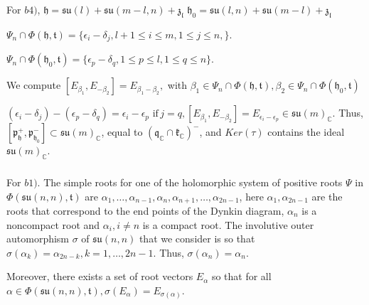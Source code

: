 \documentclass[12pt]{amsart}
\theoremstyle{definition}
\theoremstyle{remark}
\newcommand{\h}{\mathfrak{h}}
\renewcommand{\k}{{\mathfrak k}}
\renewcommand{\l}{\mathfrak l}
\newcommand{\p}{\mathfrak p}
\newcommand{\q}{\mathfrak q}
\newcommand{\z}{\mathfrak z}
\renewcommand{\t}{{\mathfrak t}}
\newcommand{\C}{{\mathbb C}}
\numberwithin{equation}{section}
\begin{document}
\medskip

 For $b4)$, $\h=  \mathfrak{su}(l)+ \mathfrak{su}(m-l,n)+  \z_\l$ $\h_0= \mathfrak{su}(l,n)+  \mathfrak{su}(m-l)+\z_\l$

$\Psi_n \cap \Phi(\h,\t)=\{ \epsilon_i -\delta_j, l+1\leq i\leq m, 1\leq j \leq n,  \}$.


$\Psi_n \cap \Phi(\h_0,\t)=\{ \epsilon_p -\delta_q,  1\leq p\leq l,   1 \leq q \leq n   \}$.

 We compute $[E_{\beta_1} ,E_{-\beta_2}]=E_{\beta_1 -\beta_2},$ with $\beta_1 \in \Psi_n \cap \Phi(\h,\t), \beta_2 \in \Psi_n \cap \Phi(\h_0,\t)$

$  (\epsilon_i -\delta_j)-
( \epsilon_p -\delta_q)=
\epsilon_i -\epsilon_p \,\, \text{if}\, j=q,     [E_{\beta_1} ,E_{-\beta_2}]=
E_{\epsilon_i -\epsilon_p}\in \mathfrak{su}(m)_\mathbb C$. Thus,
$[\p_\h^+ , \p_{\h_0}^- ] \subset \mathfrak{su}(m)_\C  $,  equal to $(\q_\C \cap \k_\C)^-$,
and  $Ker(\tau)$ contains
the ideal $\mathfrak{su}(m)_\C$.
\medskip

\subsubsection{}\label{sub:forb1}  For $b1)$. The simple roots for one of the holomorphic system of positive roots $\Psi$ in  $\Phi(\mathfrak{su}(n,n), \t)$ are $\alpha_1, \dots, \alpha_{n-1}, \alpha_n, \alpha_{n+1},\dots, \alpha_{2n-1}$, here $\alpha_1, \alpha_{2n-1}$ are the roots that correspond to the end points of the Dynkin diagram, $\alpha_n$ is a noncompact root and $\alpha_i, i\not= n$ is a compact root. The involutive outer automorphism $\sigma$ of $\mathfrak{su}(n,n)$ that we consider  is so that $\sigma(\alpha_k)=\alpha_{2n-k}, k=1,\dots, 2n-1 $. Thus, $\sigma(\alpha_n)=\alpha_n$.

  Moreover, there exists a set   of root vectors $E_\alpha$ so that for all  $\alpha \in \Phi(\mathfrak{su}(n,n), \t),  \sigma(E_\alpha)=E_{\sigma(\alpha)}$.
\end{document}
